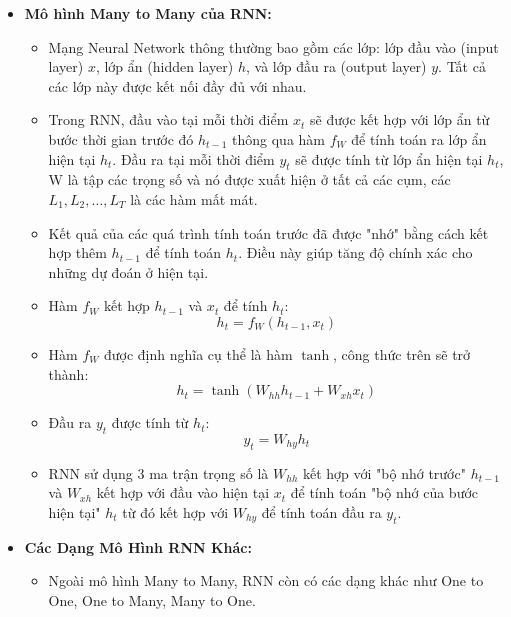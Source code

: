 \begin{itemize}  
    \item \textbf{Mô hình Many to Many của RNN:}
    \begin{itemize}
        \item Mạng Neural Network thông thường bao gồm các lớp: lớp đầu vào (input layer) \( x \), lớp ẩn (hidden layer) \( h \), và lớp đầu ra (output layer) \( y \). Tất cả các lớp này được kết nối đầy đủ với nhau.
        \item Trong RNN, đầu vào tại mỗi thời điểm \( x_t \) sẽ được kết hợp với lớp ẩn từ bước thời gian trước đó \( h_{t-1} \) thông qua hàm \( f_W \) để tính toán ra lớp ẩn hiện tại \( h_t \). Đầu ra tại mỗi thời điểm \( y_t \) sẽ được tính từ lớp ẩn hiện tại \( h_t \), W là tập các trọng số và nó được xuất hiện ở tất cả các cụm, các \( L_1, L_2, \ldots, L_T \) là các hàm mất mát.
        \item Kết quả của các quá trình tính toán trước đã được "nhớ" bằng cách kết hợp thêm \( h_{t-1} \) để tính toán \( h_t \). Điều này giúp tăng độ chính xác cho những dự đoán ở hiện tại.
        \item Hàm \( f_W \) kết hợp \( h_{t-1} \) và \( x_t \) để tính \( h_t \):
        \[
        h_t = f_W(h_{t-1}, x_t)
        \]
        \item Hàm \( f_W \) được định nghĩa cụ thể là hàm \( \tanh \), công thức trên sẽ trở thành:
        \[
        h_t = \tanh(W_{hh}h_{t-1} + W_{xh}x_t)
        \]
        \item Đầu ra \( y_t \) được tính từ \( h_t \):
        \[
        y_t = W_{hy}h_t
        \]
        \item RNN sử dụng 3 ma trận trọng số là \( W_{hh} \) kết hợp với "bộ nhớ trước" \( h_{t-1} \) và \( W_{xh} \) kết hợp với đầu vào hiện tại \( x_t \) để tính toán "bộ nhớ của bước hiện tại" \( h_t \) từ đó kết hợp với \( W_{hy} \) để tính toán đầu ra \( y_t \).
    \end{itemize}
            
    \item \textbf{Các Dạng Mô Hình RNN Khác:}
    \begin{itemize}
        \item Ngoài mô hình Many to Many, RNN còn có các dạng khác như One to One, One to Many, Many to One.
    \end{itemize}
\end{itemize}